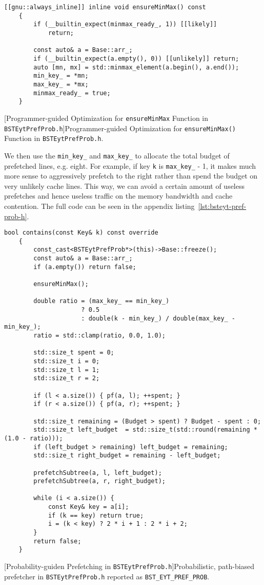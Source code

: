 \documentclass{article}
\begin{document}
\begin{lstlisting}
[[gnu::always_inline]] inline void ensureMinMax() const
    {
        if (__builtin_expect(minmax_ready_, 1)) [[likely]]
            return;

        const auto& a = Base::arr_;
        if (__builtin_expect(a.empty(), 0)) [[unlikely]] return;                      
        auto [mn, mx] = std::minmax_element(a.begin(), a.end());
        min_key_ = *mn;
        max_key_ = *mx;
        minmax_ready_ = true;
    }
\end{lstlisting}
[Programmer-guided Optimization for \texttt{ensureMinMax} Function in \texttt{BSTEytPrefProb.h}]{Programmer-guided Optimization for \texttt{ensureMinMax()} Function in \texttt{BSTEytPrefProb.h}.}
\label{lst:bsteyt-pref-prob-guded-hs}

We then use the \texttt{min\_key\_} and \texttt{max\_key\_} to allocate the total budget of prefetched lines, e.g. eight. For example, if key \texttt{k} is \texttt{max\_key\_} - 1, it makes much more sense to aggressively prefetch to the right rather than spend the budget on very unlikely cache lines. This way, we can avoid a certain amount of useless prefetches and hence useless traffic on the memory bandwidth and cache contention. The full code can be seen in the appendix listing~\ref{lst:bsteyt-pref-prob-h}.
\begin{lstlisting}
bool contains(const Key& k) const override
    {
        const_cast<BSTEytPrefProb*>(this)->Base::freeze();
        const auto& a = Base::arr_;
        if (a.empty()) return false;

        ensureMinMax();

        double ratio = (max_key_ == min_key_)
                     ? 0.5
                     : double(k - min_key_) / double(max_key_ - min_key_);
        ratio = std::clamp(ratio, 0.0, 1.0);

        std::size_t spent = 0;
        std::size_t i = 0;                
        std::size_t l = 1;                  
        std::size_t r = 2;                  

        if (l < a.size()) { pf(a, l); ++spent; }
        if (r < a.size()) { pf(a, r); ++spent; }

        std::size_t remaining = (Budget > spent) ? Budget - spent : 0;
        std::size_t left_budget  = std::size_t(std::round(remaining * (1.0 - ratio)));
        if (left_budget > remaining) left_budget = remaining;    
        std::size_t right_budget = remaining - left_budget;

        prefetchSubtree(a, l, left_budget);
        prefetchSubtree(a, r, right_budget);

        while (i < a.size()) {
            const Key& key = a[i];
            if (k == key) return true;
            i = (k < key) ? 2 * i + 1 : 2 * i + 2;
        }
        return false;
    }
\end{lstlisting}
[Probability-guiden Prefetching in \texttt{BSTEytPrefProb.h}]{Probabilistic,
path-biased prefetcher in \texttt{BSTEytPrefProb.h} reported as \texttt{BST\_EYT\_PREF\_PROB}.}
\label{lst:bsteyt-pref-prob-hs}
\end{document}
